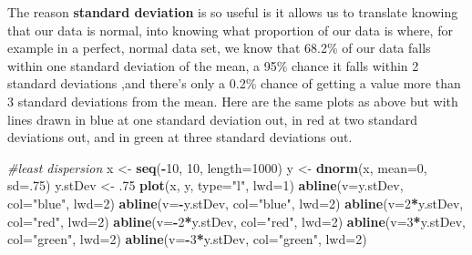 \documentclass[
]{article}
\newenvironment{Shaded}{\begin{snugshade}}{\end{snugshade}}
\newcommand{\CommentTok}[1]{\textcolor[rgb]{0.56,0.35,0.01}{\textit{#1}}}
\newcommand{\DataTypeTok}[1]{\textcolor[rgb]{0.13,0.29,0.53}{#1}}
\newcommand{\DecValTok}[1]{\textcolor[rgb]{0.00,0.00,0.81}{#1}}
\newcommand{\FloatTok}[1]{\textcolor[rgb]{0.00,0.00,0.81}{#1}}
\newcommand{\KeywordTok}[1]{\textcolor[rgb]{0.13,0.29,0.53}{\textbf{#1}}}
\newcommand{\NormalTok}[1]{#1}
\newcommand{\OperatorTok}[1]{\textcolor[rgb]{0.81,0.36,0.00}{\textbf{#1}}}
\newcommand{\StringTok}[1]{\textcolor[rgb]{0.31,0.60,0.02}{#1}}
\begin{document}
The reason \textbf{standard deviation} is so useful is it allows us to
translate knowing that our data is normal, into knowing what proportion
of our data is where, for example in a perfect, normal data set, we know
that 68.2\% of our data falls within one standard deviation of the mean,
a 95\% chance it falls within 2 standard deviations ,and there's only a
0.2\% chance of getting a value more than 3 standard deviations from the
mean. Here are the same plots as above but with lines drawn in blue at
one standard deviation out, in red at two standard deviations out, and
in green at three standard deviations out.

\begin{Shaded}
\begin{Highlighting}[]
\CommentTok{\#least dispersion}
\NormalTok{x \textless{}{-}}\StringTok{ }\KeywordTok{seq}\NormalTok{(}\OperatorTok{{-}}\DecValTok{10}\NormalTok{, }\DecValTok{10}\NormalTok{, }\DataTypeTok{length=}\DecValTok{1000}\NormalTok{)}
\NormalTok{y \textless{}{-}}\StringTok{ }\KeywordTok{dnorm}\NormalTok{(x, }\DataTypeTok{mean=}\DecValTok{0}\NormalTok{, }\DataTypeTok{sd=}\NormalTok{.}\DecValTok{75}\NormalTok{)}
\NormalTok{y.stDev \textless{}{-}}\StringTok{ }\FloatTok{.75}
\KeywordTok{plot}\NormalTok{(x, y, }\DataTypeTok{type=}\StringTok{"l"}\NormalTok{, }\DataTypeTok{lwd=}\DecValTok{1}\NormalTok{)}
\KeywordTok{abline}\NormalTok{(}\DataTypeTok{v=}\NormalTok{y.stDev, }\DataTypeTok{col=}\StringTok{"blue"}\NormalTok{, }\DataTypeTok{lwd=}\DecValTok{2}\NormalTok{)}
\KeywordTok{abline}\NormalTok{(}\DataTypeTok{v=}\OperatorTok{{-}}\NormalTok{y.stDev, }\DataTypeTok{col=}\StringTok{"blue"}\NormalTok{, }\DataTypeTok{lwd=}\DecValTok{2}\NormalTok{)}
\KeywordTok{abline}\NormalTok{(}\DataTypeTok{v=}\DecValTok{2}\OperatorTok{*}\NormalTok{y.stDev, }\DataTypeTok{col=}\StringTok{"red"}\NormalTok{, }\DataTypeTok{lwd=}\DecValTok{2}\NormalTok{)}
\KeywordTok{abline}\NormalTok{(}\DataTypeTok{v=}\OperatorTok{{-}}\DecValTok{2}\OperatorTok{*}\NormalTok{y.stDev, }\DataTypeTok{col=}\StringTok{"red"}\NormalTok{, }\DataTypeTok{lwd=}\DecValTok{2}\NormalTok{)}
\KeywordTok{abline}\NormalTok{(}\DataTypeTok{v=}\DecValTok{3}\OperatorTok{*}\NormalTok{y.stDev, }\DataTypeTok{col=}\StringTok{"green"}\NormalTok{, }\DataTypeTok{lwd=}\DecValTok{2}\NormalTok{)}
\KeywordTok{abline}\NormalTok{(}\DataTypeTok{v=}\OperatorTok{{-}}\DecValTok{3}\OperatorTok{*}\NormalTok{y.stDev, }\DataTypeTok{col=}\StringTok{"green"}\NormalTok{, }\DataTypeTok{lwd=}\DecValTok{2}\NormalTok{)}
\end{Highlighting}
\end{Shaded}
\end{document}
